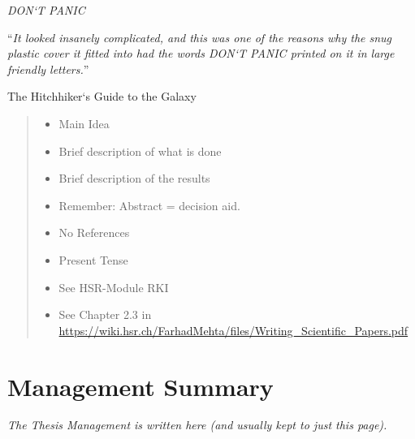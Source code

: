 
\vspace*{0.1\textheight}

{\noindent\huge\textit{DON`T PANIC}\par\vspace{10pt}}

\noindent\enquote{\itshape It looked insanely complicated, and this was one of the reasons why the snug plastic cover it fitted into had the words DON`T PANIC printed on it in large friendly letters.}\bigbreak

\hfill The Hitchhiker`s Guide to the Galaxy


\begin{abstract}
\addchaptertocentry{\abstractname} %
\begin{itemize}
	\item Main Idea
	\item Brief description of what is done
	\item  Brief description of the results
	\item  Remember: Abstract = decision aid.
	\item  No References
	\item  Present Tense
	\item  See HSR-Module RKI
	\item  See Chapter 2.3 in \url{https://wiki.hsr.ch/FarhadMehta/files/Writing_Scientific_Papers.pdf}
\end{itemize}
\end{abstract}


\chapter{Management Summary}
\addchaptertocentry{\abstractname} %
\emph{The Thesis Management is written here (and usually kept to just this page).}

